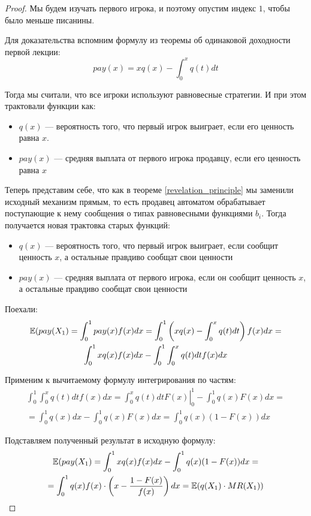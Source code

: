 \begin{proof}
Мы будем изучать первого игрока, и поэтому опустим индекс $ 1 $, чтобы было меньше писанины.

Для доказательства вспомним формулу из теоремы об одинаковой доходности первой лекции:
\begin{equation}
pay(x)=xq(x)-\int_{0}^{x}q(t)dt
\end{equation}

Тогда мы считали, что все игроки используют равновесные стратегии. И при этом трактовали функции как:

\begin{itemize}
\item $ q(x) $ — вероятность того, что первый игрок выиграет, если его ценность равна $ x $.
\item $ pay(x) $ — средняя выплата от первого игрока продавцу, если его ценность равна $ x $
\end{itemize}

Теперь представим себе, что как в теореме \ref{revelation_principle} мы заменили исходный механизм прямым, то есть продавец автоматом обрабатывает поступающие к нему сообщения о типах равновесными функциями $ b_{i} $. Тогда получается новая трактовка старых функций:

\begin{itemize}
\item $ q(x) $ — вероятность того, что первый игрок выиграет, если сообщит ценность $ x $, а остальные правдиво сообщат свои ценности
\item $ pay(x) $ — средняя выплата от первого игрока, если он сообщит ценность $x$, а остальные правдиво сообщат свои ценности
\end{itemize}

Поехали:
\begin{multline}
\mathbb{E}(pay(X_{1})=\int_{0}^{1} pay(x)f(x)dx=\int_{0}^{1} \left( xq(x)-\int_{0}^{x}q(t)dt \right) f(x) dx=\\
\int_{0}^{1}xq(x)f(x)dx-\int_{0}^{1}\int_{0}^{x}q(t)dt f(x)dx
\end{multline}

Применим к вычитаемому формулу интегрирования по частям:
\begin{multline}
\int_{0}^{1}\int_{0}^{x}q(t)dt f(x)dx=\left. \int_{0}^{x}q(t)dt F(x)\right|_{0}^{1}-\int_{0}^{1}q(x)F(x)dx=\\
=\int_{0}^{1} q(x)dx-\int_{0}^{1}q(x)F(x)dx=\int_{0}^{1} q(x)(1-F(x))dx
\end{multline}

Подставляем полученный результат в исходную формулу:
\begin{multline}
\mathbb{E}(pay(X_{1})=\int_{0}^{1}xq(x)f(x)dx-\int_{0}^{1} q(x)(1-F(x))dx=\\
=\int_{0}^{1}q(x)f(x)\cdot \left(x-\frac{1-F(x)}{f(x)} \right)dx=\mathbb{E}(q(X_{1})\cdot MR(X_{1}))
\end{multline}
\end{proof}

